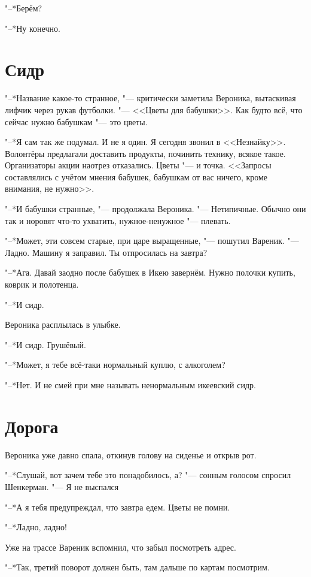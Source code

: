"--*Берём?

"--*Ну конечно.

\section{Сидр}

"--*Название какое-то странное, "--- критически заметила Вероника, вытаскивая лифчик через рукав футболки.
"--- <<Цветы для бабушки>>.
Как будто всё, что сейчас нужно бабушкам "--- это цветы.

"--*Я сам так же подумал.
И не я один.
Я сегодня звонил в <<Незнайку>>.
Волонтёры предлагали доставить продукты, починить технику, всякое такое.
Организаторы акции наотрез отказались.
Цветы "--- и точка.
<<Запросы составлялись с учётом мнения бабушек, бабушкам от вас ничего, кроме внимания, не нужно>>.

"--*И бабушки странные, "--- продолжала Вероника.
"--- Нетипичные.
Обычно они так и норовят что-то ухватить, нужное-ненужное "--- плевать.

"--*Может, эти совсем старые, при царе выращенные, "--- пошутил Вареник.
"--- Ладно.
Машину я заправил.
Ты отпросилась на завтра?

"--*Ага.
Давай заодно после бабушек в Икею завернём.
Нужно полочки купить, коврик и полотенца.

"--*И сидр.

Вероника расплылась в улыбке.

"--*И сидр.
Грушёвый.

"--*Может, я тебе всё-таки нормальный куплю, с алкоголем?

"--*Нет.
И не смей при мне называть ненормальным икеевский сидр.

\section{Дорога}

Вероника уже давно спала, откинув голову на сиденье и открыв рот.

"--*Слушай, вот зачем тебе это понадобилось, а? "--- сонным голосом спросил Шенкерман.
"--- Я не выспался\ldotst

"--*А я тебя предупреждал, что завтра едем.
Цветы не помни.

"--*Ладно, ладно!

Уже на трассе Вареник вспомнил, что забыл посмотреть адрес.

"--*Так, третий поворот должен быть, там дальше по картам посмотрим.

